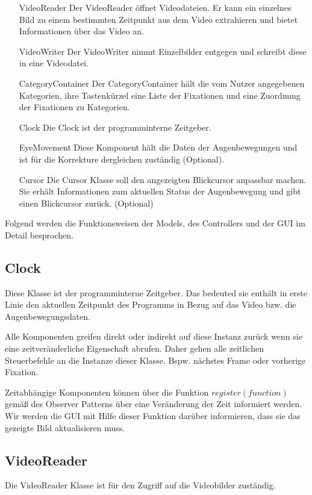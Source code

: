 \documentclass[a4paper,draft]{scrartcl}
\begin{document}
  \begin{enumerate}
    \item[VideoReader] Der VideoReader öffnet Videodateien. Er kann ein einzelnes Bild zu einem bestimmten Zeitpunkt aus dem Video extrahieren und bietet Informationen über das Video an.
    \item[VideoWriter] Der VideoWriter nimmt Einzelbilder entgegen und schreibt diese in eine Videodatei.
    \item[CategoryContainer] Der CategoryContainer hält die vom Nutzer angegebenen Kategorien, ihre Tastenkürzel eine Liste der Fixationen und eine Zuordnung der Fixationen zu Kategorien.
    \item[Clock] Die Clock ist der programminterne Zeitgeber.
    \item[EyeMovement] Diese Komponent hält die Daten der Augenbewegungen und ist für die Korrekture dergleichen zuständig (Optional).
    \item[Cursor] Die Cursor Klasse soll den angezeigten Blickcursor anpassbar machen. Sie erhält Informationen zum aktuellen Status der Augenbewegung und gibt einen Blickcursor zurück. (Optional)
  \end{enumerate}

Folgend werden die Funktionsweisen der Models, des Controllers und der GUI im Detail besprochen.

\subsection{Clock}
Diese Klasse ist der programminterne Zeitgeber. 
Das bedeuted sie enth\"alt in erste Linie den aktuellen Zeitpunkt des Programms in Bezug auf das Video bzw. die Augenbewegungsdaten.

Alle Komponenten greifen direkt oder indirekt auf diese Instanz zur\"uck wenn sie eine zeitver\"anderliche Eigenschaft abrufen. Daher gehen alle zeitlichen Steuerbefehle an die Instanze dieser Klasse. Bspw. n\"achstes Frame oder vorherige Fixation.

Zeitabh\"angige Komponenten k\"onnen \"uber die Funktion $register(function)$ gem\"aß des Observer Patterns \"uber eine Ver\"anderung der Zeit informiert werden.
Wir werden die GUI mit Hilfe dieser Funktion dar\"uber informieren, dass sie das gezeigte Bild aktualisieren muss.

\subsection{VideoReader}
Die VideoReader Klasse ist f\"ur den Zugriff auf die Videobilder zust\"andig.
\end{document}
